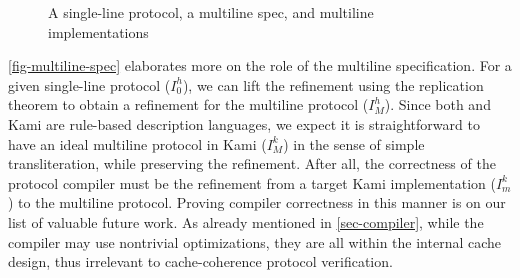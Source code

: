 \documentclass[sigplan,10pt,review,anonymous,screen]{acmart}\settopmatter{printfolios=true,printccs=false,printacmref=false}
\begin{document}
\begin{figure}[h]
  \centering
  \caption{A single-line protocol, a multiline spec, and multiline implementations}
  \label{fig-multiline-spec}
\end{figure}

\autoref{fig-multiline-spec} elaborates more on the role of the multiline specification.
For a given \hemiola{} single-line protocol ($I^{h}_{0}$), we can lift the refinement using the replication theorem to obtain a refinement for the multiline protocol ($I^{h}_{M}$).
Since both \hemiola{} and Kami are rule-based description languages, we expect it is straightforward to have an ideal multiline protocol in Kami ($I^{k}_{M}$) in the sense of simple transliteration, while preserving the refinement.
After all, the correctness of the protocol compiler must be the refinement from a target Kami implementation ($I^{k}_{m}$) to the multiline protocol.
Proving compiler correctness in this manner is on our list of valuable future work.
As already mentioned in \autoref{sec-compiler}, while the compiler may use nontrivial optimizations, they are all within the internal cache design, thus irrelevant to cache-coherence protocol verification.
\end{document}
